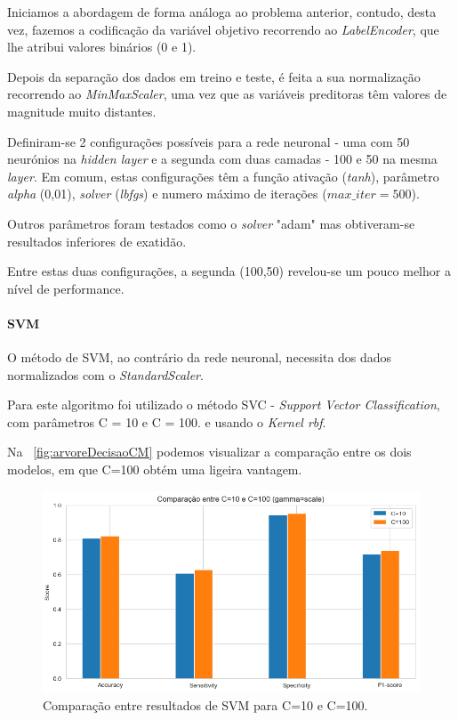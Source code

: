 \documentclass[conference]{IEEEtran}
\begin{document}
Iniciamos a abordagem de forma análoga ao problema anterior, contudo, desta vez, fazemos a codificação da variável objetivo recorrendo ao \textit{LabelEncoder}, que lhe atribui valores binários (0 e 1).

Depois da separação dos dados em treino e teste, é feita a sua normalização recorrendo ao \textit{MinMaxScaler}, uma vez que as variáveis preditoras têm valores de magnitude muito distantes.

Definiram-se 2 configurações possíveis para a rede neuronal - uma com 50 neurónios na \textit{hidden layer} e a segunda com duas camadas - 100 e 50 na mesma \textit{layer}. Em comum, estas configurações têm a função ativação (\textit{tanh}), parâmetro \textit{alpha} (0,01), \textit{solver} (\textit{lbfgs}) e numero máximo de iterações ($max\_iter = 500$).

Outros parâmetros foram testados como o \textit{solver} "adam" mas obtiveram-se resultados inferiores de exatidão.

Entre estas duas configurações, a segunda (100,50) revelou-se um pouco melhor a nível de performance. 

\medskip

\paragraph{SVM}

O método de SVM, ao contrário da rede neuronal, necessita dos dados normalizados com o \textit{StandardScaler}. 

Para este algoritmo foi utilizado o método SVC - \textit{Support Vector Classification}, com parâmetros C = 10 e C = 100. e usando o \textit{Kernel rbf}.

Na \figurename~\ref{fig:arvoreDecisaoCM} podemos visualizar a comparação entre os dois modelos, em que C=100 obtém uma ligeira vantagem.

\begin{figure}[h]
	\centering
	\includegraphics[width=0.9\linewidth]{svm_compare}
	\caption{Comparação entre resultados de SVM para C=10 e C=100.}
	\label{fig:svm_compare}
\end{figure}
\end{document}
